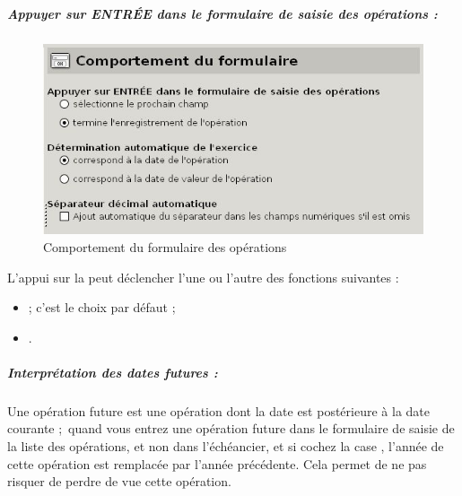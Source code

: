 \subparagraph{Appuyer sur ENTRÉE dans le formulaire de saisie des opérations :\label{setup-form-behaviour-enter}}
 


\ifIllustration
\begin{figure}[htbp]
	\begin{center}
		\includegraphics[scale=0.5]{image/screenshot/setup_formBehaviour}
	\end{center}
	\caption{Comportement du formulaire des opérations}
	\label{setup-formBehaviour-img}
\end{figure}
\fi

L'appui sur la  peut déclencher l'une ou l'autre des fonctions suivantes :

\begin{itemize}
	\item {} ; c'est le choix par défaut ;
	\item {}.
\end{itemize}




\subparagraph{Interprétation des dates futures :\label{setup-form-behaviour-future}}

Une opération future est une opération dont la date est postérieure à la date courante ; quand vous entrez une opération future dans le formulaire de saisie de la liste des opérations, et non dans l'échéancier, et si  cochez la case , l'année de cette opération est remplacée par l'année précédente. Cela permet de ne pas risquer de perdre de vue cette opération.

